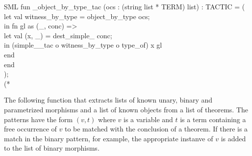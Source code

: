 \documentclass[11pt,a4paper]{article}
\begin{document}
\begin{GFT}{SML}
\+fun \PrNL{}\PrLG{}\_object\_by\_type\_tac\PrNN{} (ocs : (string list * TERM) list) : TACTIC = (\\
\+	let	val witness\_by\_type = object\_by\_type ocs;\\
\+	in	fn gl as (\_, conc) => \\
\+		let	val (x, \_) = dest\_simple\_\PrLG{} conc;\\
\+		in	(simple\_\PrLG{}\_tac o witness\_by\_type o type\_of) x gl\\
\+		end\\
\+	end\\
\+);\\
\+(*\\
\end{GFT}
The following function that extracts lists of known unary, binary and parametrized morphisms and a list
of known objects from a list of theorems.
The patterns have the form $(v, t)$ where $v$ is a variable and $t$ is a term containing a free
occurrence of $v$ to be matched with the conclusion of a theorem.
If there is a match in the binary pattern, for example, the appropriate instanve of $v$ is added to the list
of binary morphisms.
\end{document}
